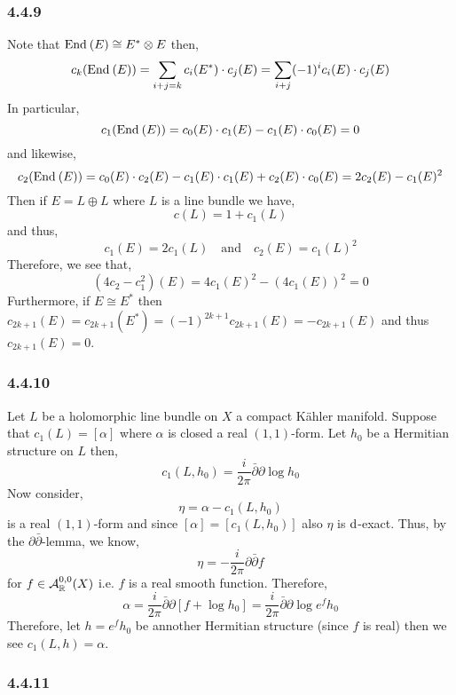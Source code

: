 \documentclass[12pt]{article}
\begin{document}
\subsubsection{4.4.9}

Note that $\mathrm{End}_{} \left( E \right) \cong E^* \otimes E$ then,
\[ c_k(\mathrm{End}_{} \left( E \right)) = \sum_{i + j = k} c_i(E^*) \cdot c_j(E) = \sum_{i + j} (-1)^i c_i(E) \cdot c_j(E) \]
In particular,
\[ c_1(\mathrm{End}_{} \left( E \right)) = c_0(E) \cdot c_1(E) - c_1(E) \cdot c_0(E) = 0 \]
and likewise,
\[ c_2(\mathrm{End}_{} \left( E \right)) = c_0(E) \cdot c_2(E) - c_1(E) \cdot c_1(E) + c_2(E) \cdot c_0(E) = 2 c_2(E) - c_1(E)^2 \]
Then if $E = L \oplus L$ where $L$ is a line bundle we have,
\[ c(L) = 1 + c_1(L) \]
and thus,
\[ c_1(E) = 2 c_1(L) \quad \text{and} \quad c_2(E) = c_1(L)^2 \]
Therefore, we see that,
\[ (4 c_2 - c_1^2)(E) = 4 c_1(E)^2 - (4 c_1(E))^2 = 0 \]
Furthermore, if $E \cong E^*$ then $c_{2k+1}(E) = c_{2k+1}(E^*) = (-1)^{2k + 1} c_{2k+1}(E) = - c_{2k + 1}(E)$ and thus $c_{2k + 1}(E) = 0$.

\subsubsection{4.4.10}

Let $L$ be a holomorphic line bundle on $X$ a compact K\"{a}hler manifold. Suppose that $c_1(L) = [\alpha]$ where $\alpha$ is closed a real $(1,1)$-form. Let $h_0$ be a Hermitian structure on $L$ then,
\[ c_1(L, h_0) = \frac{i}{2 \pi} \bar{\partial} \partial \log{h_0} \]
Now consider,
\[ \eta = \alpha - c_1(L, h_0) \]
is a real $(1,1)$-form and since $[\alpha] = [c_1(L, h_0)]$ also $\eta$ is $\mathrm{d}$-exact. Thus, by the $\partial \bar{\partial}$-lemma, we know,
\[ \eta = - \frac{i}{2 \pi} \partial \bar{\partial} f \]
for $f \in \mathcal{A}^{0, 0}_{\mathbb{R}}(X)$ i.e. $f$ is a real smooth function. Therefore,
\[ \alpha = \frac{i}{2 \pi} \bar{\partial} \partial \left[ f + \log{h_0} \right] = \frac{i}{2 \pi} \bar{\partial} \partial \log{e^f h_0} \]
Therefore, let $h = e^f h_0$ be annother Hermitian structure (since $f$ is real) then we see $c_1(L, h) = \alpha$.

\subsubsection{4.4.11}
\end{document}
